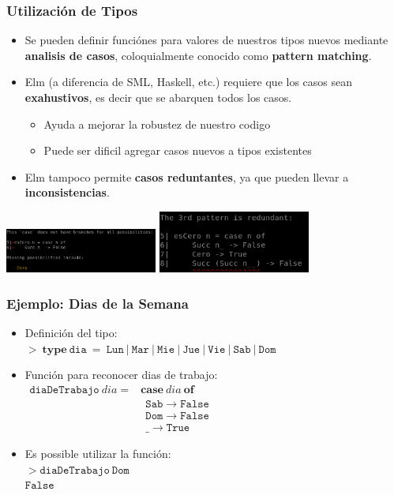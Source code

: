 \documentclass{beamer}
\begin{document}
\begin{frame}
\frametitle{Utilizaci\'on de Tipos}
\begin{itemize}
    \item{Se pueden definir funci\'ones para valores de nuestros tipos
    nuevos mediante {\bf analisis de casos}, coloquialmente conocido como
    {\bf pattern matching}.}
    \item{Elm (a diferencia de SML, Haskell, etc.) requiere que los casos
    sean {\bf exahustivos}, es decir que se abarquen todos los casos.
    \begin{itemize}
        \item{Ayuda a mejorar la robustez de nuestro codigo}
        \item{Puede ser dificil agregar casos nuevos a tipos existentes}
    \end{itemize}
    }
    \item{Elm tampoco permite {\bf casos reduntantes}, ya que pueden llevar
    a {\bf inconsistencias}.}
\end{itemize}

\begin{center}
\includegraphics[width=5cm]{./missing.png}
\includegraphics[width=5cm]{./redundant.png}
\end{center}

\end{frame}

\begin{frame}
\frametitle{Ejemplo: Dias de la Semana}
\begin{itemize}
    \item{Definici\'on del tipo: \\
    $>\ \mathbf{type}\ \mathtt{dia\ =\ Lun\ |\ Mar\ |\ Mie\ |\ 
    Jue\ |\ Vie\ |\ Sab\ |\ Dom}$}
    \item{Funci\'on para reconocer dias de trabajo:\vspace{0.5cm}
    $
        \begin{array}{ll}
            \mathtt{diaDeTrabajo}\ dia=&\mathbf{case}\ dia\ \mathbf{of} \\
            & \ \ \mathtt{Sab} \rightarrow \mathtt{False} \\
            & \ \ \mathtt{Dom} \rightarrow \mathtt{False} \\
            & \ \ \_ \rightarrow \mathtt{True}
        \end{array}
    $}
    \item{Es possible utilizar la funci\'on:\\
    $>\mathtt{diaDeTrabajo}\ \mathtt{Dom}$\\
    $\mathtt{False}$}
\end{itemize}
\end{frame}
\end{document}

